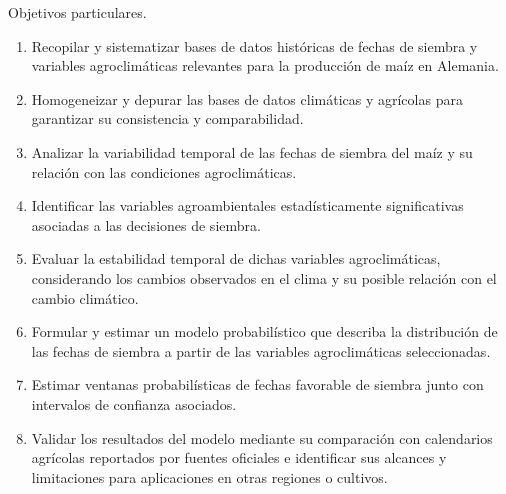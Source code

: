 Objetivos particulares.

\begin{enumerate}
	\item Recopilar y sistematizar bases de datos históricas de fechas de siembra y variables agroclimáticas relevantes para la producción de maíz en Alemania.
	
    \item Homogeneizar y depurar las bases de datos climáticas y agrícolas para garantizar su consistencia y comparabilidad.
    
    \item Analizar la variabilidad temporal de las fechas de siembra del maíz y su relación con las condiciones agroclimáticas.
    
    \item Identificar las variables agroambientales estadísticamente significativas asociadas a las decisiones de siembra.
    
    \item Evaluar la estabilidad temporal de dichas variables agroclimáticas, considerando los cambios observados en el clima y su posible relación con el cambio climático.
    
    \item Formular y estimar un modelo probabilístico que describa la distribución de las fechas de siembra a partir de las variables agroclimáticas seleccionadas.
    
    \item Estimar ventanas probabilísticas de fechas favorable de siembra junto con intervalos de confianza asociados.
    
    \item Validar los resultados del modelo mediante su comparación con calendarios agrícolas reportados por fuentes oficiales e identificar sus alcances y limitaciones para aplicaciones en otras regiones o cultivos.
\end{enumerate}